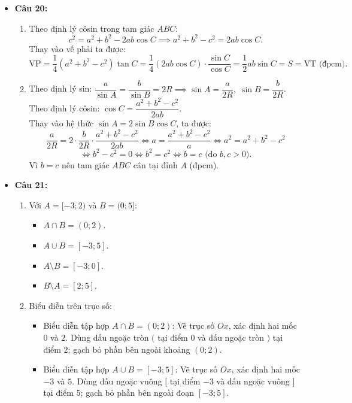 \documentclass[12pt,a4paper]{article}
\begin{document}
\begin{itemize}[leftmargin=0.6cm, itemsep=4pt]
    \item \textbf{Câu 20:}
    \begin{enumerate}
        \item Theo định lý côsin trong tam giác $ABC$:
        \[
        c^2 = a^2 + b^2 - 2ab\cos C \implies a^2 + b^2 - c^2 = 2ab\cos C.
        \]
        Thay vào vế phải ta được:
        \[
        \text{VP} = \dfrac{1}{4}(a^2 + b^2 - c^2)\tan C = \dfrac{1}{4}(2ab\cos C) \cdot \dfrac{\sin C}{\cos C} = \dfrac{1}{2}ab\sin C = S = \text{VT (đpcm)}.
        \]
        \item Theo định lý sin: $\dfrac{a}{\sin A} = \dfrac{b}{\sin B} = 2R \implies \sin A = \dfrac{a}{2R},\; \sin B = \dfrac{b}{2R}$.\\
        Theo định lý côsin: $\cos C = \dfrac{a^2 + b^2 - c^2}{2ab}$.\\
        Thay vào hệ thức $\sin A = 2\sin B \cos C$, ta được:
        \[
        \dfrac{a}{2R} = 2 \cdot \dfrac{b}{2R} \cdot \dfrac{a^2 + b^2 - c^2}{2ab} \iff a = \dfrac{a^2 + b^2 - c^2}{a} \iff a^2 = a^2 + b^2 - c^2
        \]
        \[
        \iff b^2 - c^2 = 0 \iff b^2 = c^2 \iff b = c\text{ (do } b, c > 0\text{)}.
        \]
        Vì $b = c$ nên tam giác $ABC$ cân tại đỉnh $A$ (đpcm).
    \end{enumerate}

    \item \textbf{Câu 21:}
    \begin{enumerate}
        \item Với $A = [-3; 2)$ và $B = (0; 5]$:
        \begin{itemize}
            \item $A \cap B = (0; 2)$.
            \item $A \cup B = [-3; 5]$.
            \item $A \setminus B = [-3; 0]$.
            \item $B \setminus A = [2; 5]$.
        \end{itemize}
        \item Biểu diễn trên trục số:
        \begin{itemize}
            \item Biểu diễn tập hợp $A \cap B = (0; 2)$: Vẽ trục số $Ox$, xác định hai mốc $0$ và $2$. Dùng dấu ngoặc tròn $($ tại điểm $0$ và dấu ngoặc tròn $)$ tại điểm $2$; gạch bỏ phần bên ngoài khoảng $(0; 2)$.
            \item Biểu diễn tập hợp $A \cup B = [-3; 5]$: Vẽ trục số $Ox$, xác định hai mốc $-3$ và $5$. Dùng dấu ngoặc vuông $[$ tại điểm $-3$ và dấu ngoặc vuông $]$ tại điểm $5$; gạch bỏ phần bên ngoài đoạn $[-3; 5]$.
        \end{itemize}
    \end{enumerate}


\end{itemize}
\end{document}
